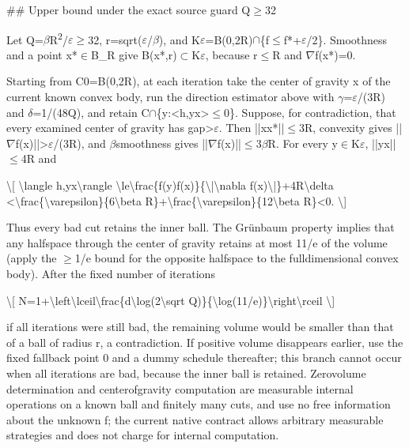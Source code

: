 \documentclass[10pt,a4paper]{article}
\begin{document}
\#\# Upper bound under the exact source guard Q\ensuremath{\ge}32

Let Q=\ensuremath{\beta}R\textsuperscript{2}/\ensuremath{\varepsilon}\ensuremath{\ge}32, r=sqrt(\ensuremath{\varepsilon}/\ensuremath{\beta}), and K\ensuremath{\varepsilon}=B(0,2R)\ensuremath{\cap}\{f\ensuremath{\le}f*+\ensuremath{\varepsilon}/2\}. Smoothness and a point x*\ensuremath{\in}B\_R give B(x*,r)\ensuremath{\subset}K\ensuremath{\varepsilon}, because r\ensuremath{\le}R and \ensuremath{\nabla}f(x*)=0.

Starting from C0=B(0,2R), at each iteration take the center of gravity x of the current known convex body, run the direction estimator above with \ensuremath{\gamma}=\ensuremath{\varepsilon}/(3R) and \ensuremath{\delta}=1/(48Q), and retain C\ensuremath{\cap}\{y:<h,yx>\ensuremath{\le}0\}. Suppose, for contradiction, that every examined center of gravity has gap>\ensuremath{\varepsilon}. Then ||xx*||\ensuremath{\le}3R, convexity gives ||\ensuremath{\nabla}f(x)||>\ensuremath{\varepsilon}/(3R), and \ensuremath{\beta}smoothness gives ||\ensuremath{\nabla}f(x)||\ensuremath{\le}3\ensuremath{\beta}R. For every y\ensuremath{\in}K\ensuremath{\varepsilon}, ||yx||\ensuremath{\le}4R and

\textbackslash{}[
\textbackslash{}langle h,yx\textbackslash{}rangle
\textbackslash{}le\textbackslash{}frac\{f(y)f(x)\}\{\textbackslash{}|\textbackslash{}nabla f(x)\textbackslash{}|\}+4R\textbackslash{}delta
<\textbackslash{}frac\{\textbackslash{}varepsilon\}\{6\textbackslash{}beta R\}+\textbackslash{}frac\{\textbackslash{}varepsilon\}\{12\textbackslash{}beta R\}<0.
\textbackslash{}]

Thus every bad cut retains the inner ball. The Grünbaum property implies that any halfspace through the center of gravity retains at most 11/e of the volume (apply the \ensuremath{\ge}1/e bound for the opposite halfspace to the fulldimensional convex body). After the fixed number of iterations

\textbackslash{}[
N=1+\textbackslash{}left\textbackslash{}lceil\textbackslash{}frac\{d\textbackslash{}log(2\textbackslash{}sqrt Q)\}\{\textbackslash{}log(11/e)\}\textbackslash{}right\textbackslash{}rceil
\textbackslash{}]

if all iterations were still bad, the remaining volume would be smaller than that of a ball of radius r, a contradiction. If positive volume disappears earlier, use the fixed fallback point 0 and a dummy schedule thereafter; this branch cannot occur when all iterations are bad, because the inner ball is retained. Zerovolume determination and centerofgravity computation are measurable internal operations on a known ball and finitely many cuts, and use no free information about the unknown f; the current native contract allows arbitrary measurable strategies and does not charge for internal computation.
\end{document}

